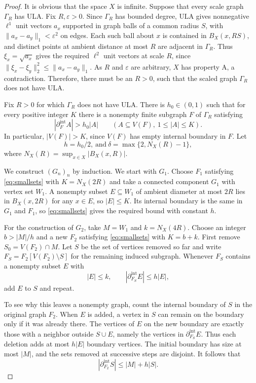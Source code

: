 \documentclass[11pt,a4paper]{article}
\theoremstyle{definition}\newtheorem{definition}[theorem]{Definition}
\theoremstyle{remark}\newtheorem{remark}[theorem]{Remark}
\begin{document}
\begin{proof}
It is obvious that the space $X$ is infinite.
Suppose that every scale graph $\Gamma_R$ has ULA. Fix
$R,\varepsilon>0$. Since $\Gamma_R$ has bounded degree, ULA gives
nonnegative $\ell^1$ unit vectors $a_x$ supported in graph balls
of a common radius $S$, with
$\lVert a_x-a_y\rVert_1<\varepsilon^2$ on edges. Each such ball
about $x$ is contained in $B_X(x,RS)$, and distinct points at
ambient distance at most $R$ are adjacent in $\Gamma_R$. Thus
$\xi_x=\sqrt{a_x}$ gives the required $\ell^2$ unit vectors at
scale $R$, since
$\lVert\xi_x-\xi_y\rVert_2^2\le\lVert a_x-a_y\rVert_1$.
As $R$ and $\varepsilon$ are arbitrary, $X$ has property A,
a contradiction. Therefore, there must be an $R>0$, such that the scaled graph $\Gamma_R$ does not have ULA. 

Fix $R>0$ for which $\Gamma_R$ does not have ULA. There is $h_0\in(0,1)$
such that for every positive integer $K$ there is a nonempty finite
subgraph $F$ of $\Gamma_R$ satisfying
\begin{equation}\label{eq:smallsets}
|\partial_F^{\mathrm{int}}A|>h_0|A|
\qquad (A\subseteq V(F),\ 1\le |A|\le K).
\end{equation}
In particular, $|V(F)|>K$, since $V(F)$ has empty internal
boundary in $F$. Let 
$$h=h_0/2, ~\mbox{and}~\delta=\max\{2,N_X(R)-1\},$$
where $N_X(R)=\sup_{x\in X}|B_X(x,R)|$.

We construct $(G_n)_n$ by induction. We start with $G_1$.
Choose $F_1$ satisfying \eqref{eq:smallsets} with $K=N_X(2R)$
and take a connected component $G_1$ with vertex set $W_1$.
A nonempty subset $E\subseteq W_1$ of ambient diameter at most
$2R$ lies in $B_X(x,2R)$ for any $x\in E$, so $|E|\le K$.
Its internal boundary is the same in $G_1$ and $F_1$, so
\eqref{eq:smallsets} gives the required bound with constant $h$.

For the construction of $G_2$, take $M=W_1$ and $k=N_X(4R)$.
Choose an integer $b>|M|/h$ and a new $F_2$ satisfying
\eqref{eq:smallsets} with $K=b+k$. First remove
$S_0=V(F_2)\cap M$. Let $S$ be the set of vertices removed so far
and write $F_S=F_2[V(F_2)\setminus S]$ for the remaining induced
subgraph. Whenever $F_S$ contains a nonempty subset $E$ with
$$
|E|\le k,\qquad |\partial_{F_S}^{\mathrm{int}}E|\le h|E|,
$$
add $E$ to $S$ and repeat.

To see why this leaves a nonempty graph, count the internal
boundary of $S$ in the original graph $F_2$. When $E$ is added,
a vertex in $S$ can remain on the boundary only if it was already
there. The vertices of $E$ on the new boundary are exactly those
with a neighbor outside $S\cup E$, namely the vertices in
$\partial_{F_S}^{\mathrm{int}}E$. Thus each deletion adds at most
$h|E|$ boundary vertices. The initial boundary has size at most
$|M|$, and the sets removed at successive steps are disjoint.
It follows that
$$
|\partial_{F_2}^{\mathrm{int}}S|\le |M|+h|S|.
$$


\end{proof}
\end{document}
